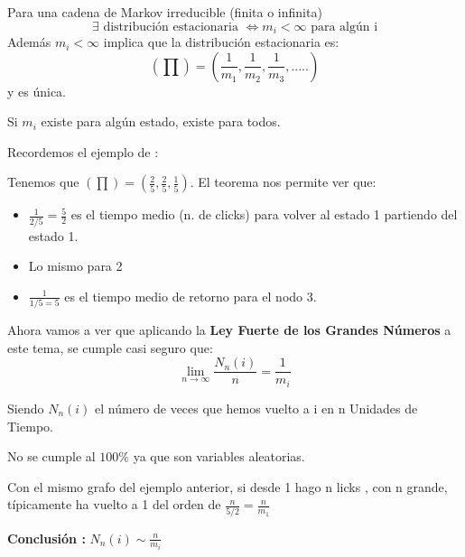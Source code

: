 	\begin{theorem}[Teorema 4]
		\label{Markov_tma4}
		Para una cadena de Markov irreducible (finita o infinita)
		$$\exists \text{ distribución estacionaria } \iff m_i <\infty \text{ para algún i}$$
		Además $m_i<\infty$ implica que la distribución estacionaria es:
		$$(\prod) = (\frac{1}{m_1}, \frac{1}{m_2},\frac{1}{m_3}, .....)$$
		y es única.
	\end{theorem}
	\obs Si $m_i$ existe para algún estado, existe para todos.
	
	\begin{example}
		Recordemos el ejemplo de :
			\begin{center}
				\centering
			\end{center}
		
		Tenemos que $(\prod) = (\frac{2}{5}, \frac{2}{5}, \frac{1}{5})$. El teorema nos permite ver que:
		\begin{itemize}
			\item $\frac{1}{2/5} = \frac{5}{2}$ es el tiempo medio (n. de clicks) para volver al estado 1 partiendo del estado 1.
			\item Lo mismo para 2
			\item $\frac{1}{1/5 = 5}$ es el tiempo medio de retorno para el nodo 3.
		\end{itemize}
	\end{example}
	
	Ahora vamos a ver que aplicando la \textbf{Ley Fuerte de los Grandes Números} a este tema, se cumple casi seguro que:
	$$\lim_{n \rightarrow \infty} \frac{N_n (i)}{n} = \frac{1}{m_i}$$
	
	Siendo $N_n (i)$ el número de veces que hemos vuelto a i en n Unidades de Tiempo.
	
	\obs No se cumple al $100\%$ ya que son variables aleatorias.
	
	\begin{example}
		Con el mismo grafo del ejemplo anterior, si desde 1 hago n licks , con n grande, típicamente ha vuelto a 1 del orden de $\frac{n}{5/2} = \frac{n}{m_1}$
	\end{example}
	
	\textbf{Conclusión :} $N_n (i) \sim \frac{n}{m_i}$